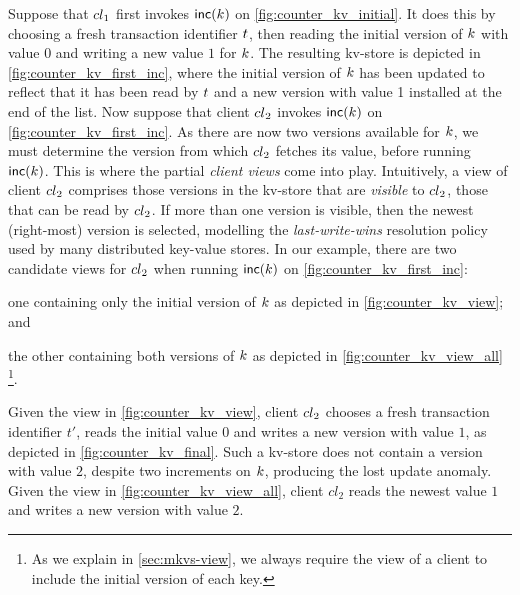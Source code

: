 Suppose that \({cl}_1\) first invokes \(\mathsf{inc}(k)\) on
\cref{fig:counter_kv_initial}.
It does this by choosing a fresh transaction identifier \(t\), 
 then reading the initial version
of \(k\) with value \(0\) 
and writing  a new value \(1\) for \(k\). 
The resulting kv-store is depicted in \cref{fig:counter_kv_first_inc},
where  the initial version of \(k\)  has been  updated to reflect that it
has been read by \(t\) and a new version with value 1 installed at
the end of the list. 
Now suppose that client \({cl}_2\) invokes \(\mathsf{inc}(k)\)  on
\cref{fig:counter_kv_first_inc}.  As there are now two versions
available for \(k\), we must determine the version from which
\({cl}_2\) fetches its value, before running \(\mathsf{inc}(k)\).  This is
where the partial \emph{client views} come into play.  Intuitively, a view of
client \({cl}_2\) comprises those versions in the kv-store that are
\emph{visible} to \({cl}_2\), \ie those that can be read by
\({cl}_2\).  If more than one version is visible, then the newest
(right-most) version is selected, modelling the \emph{last-write-wins}
resolution policy used by many distributed key-value stores.
In our example, there are two  candidate views for \({cl}_2\) when running
\(\mathsf{inc}(k)\) on \cref{fig:counter_kv_first_inc}: 
\begin{enumerate*}
\item one containing
only the initial version of \(k\) as depicted in \cref{fig:counter_kv_view}; and
\item the other containing both versions of \(k\) as depicted in \cref{fig:counter_kv_view_all}%
\footnote{As we explain in \cref{sec:mkvs-view}, we always require
  the view of a client to include the initial version of each key.}.
\end{enumerate*}
Given the view in \cref{fig:counter_kv_view},
client \({cl}_2\) chooses a fresh
transaction identifier \(t'\), reads the initial value \(0\) and writes a
new version with value \(1\), as depicted in \cref{fig:counter_kv_final}. 
Such a kv-store does not contain a
version with value \(2\), despite two increments on \(k\), producing
the lost update anomaly. 
Given the view in \cref{fig:counter_kv_view_all},
client \(cl_2\) reads the newest
value \(1\) and writes a new version with value \(2\).


